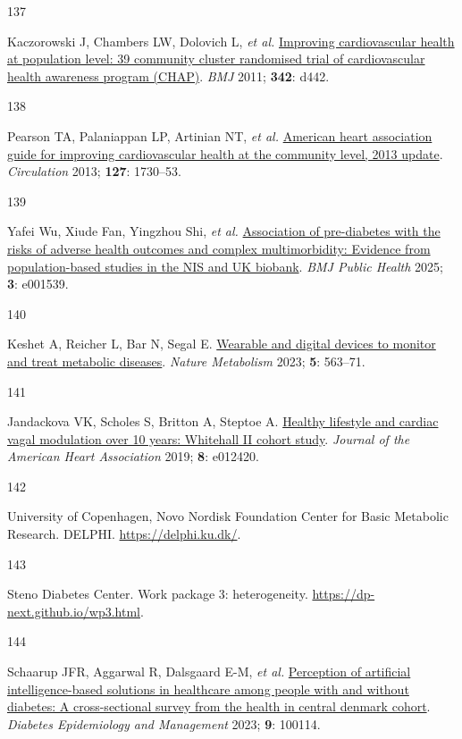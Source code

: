 \documentclass[
  a4paper,
  headsepline=true,
  open=left]{scrbook}
\newlength{\cslhangindent}
\newlength{\csllabelwidth}
\newlength{\cslentryspacingunit} %
\newenvironment{CSLReferences}[2] %
 {%
  \setlength{\parindent}{0pt}
  \ifodd #1
  \let\oldpar\par
  \def\par{\hangindent=\cslhangindent\oldpar}
  \fi
  \setlength{\parskip}{#2\cslentryspacingunit}
 }%
 {}
\newcommand{\CSLLeftMargin}[1]{\parbox[t]{\csllabelwidth}{#1}}
\newcommand{\CSLRightInline}[1]{\parbox[t]{\linewidth - \csllabelwidth}{#1}\break}
\begin{document}
\begin{CSLReferences}{0}{0}
\leavevmode{}%
\CSLLeftMargin{137 }%
\CSLRightInline{Kaczorowski J, Chambers LW, Dolovich L, \emph{et al.}
\href{https://doi.org/10.1136/bmj.d442}{Improving cardiovascular health
at population level: 39 community cluster randomised trial of
cardiovascular health awareness program (CHAP)}. \emph{BMJ} 2011;
\textbf{342}: d442.}

\leavevmode{}%
\CSLLeftMargin{138 }%
\CSLRightInline{Pearson TA, Palaniappan LP, Artinian NT, \emph{et al.}
\href{https://doi.org/10.1161/CIR.0b013e31828f8a94}{American heart
association guide for improving cardiovascular health at the community
level, 2013 update}. \emph{Circulation} 2013; \textbf{127}: 1730--53.}

\leavevmode{}%
\CSLLeftMargin{139 }%
\CSLRightInline{Yafei Wu, Xiude Fan, Yingzhou Shi, \emph{et al.}
\href{https://doi.org/10.1136/bmjph-2024-001539}{Association of
pre-diabetes with the risks of adverse health outcomes and complex
multimorbidity: Evidence from population-based studies in the NIS and UK
biobank}. \emph{BMJ Public Health} 2025; \textbf{3}: e001539.}

\leavevmode{}%
\CSLLeftMargin{140 }%
\CSLRightInline{Keshet A, Reicher L, Bar N, Segal E.
\href{https://doi.org/10.1038/s42255-023-00778-y}{Wearable and digital
devices to monitor and treat metabolic diseases}. \emph{Nature
Metabolism} 2023; \textbf{5}: 563--71.}

\leavevmode{}%
\CSLLeftMargin{141 }%
\CSLRightInline{Jandackova VK, Scholes S, Britton A, Steptoe A.
\href{https://doi.org/10.1161/JAHA.119.012420}{Healthy lifestyle and
cardiac vagal modulation over 10 years: Whitehall II cohort study}.
\emph{Journal of the American Heart Association} 2019; \textbf{8}:
e012420.}

\leavevmode{}%
\CSLLeftMargin{142 }%
\CSLRightInline{University of Copenhagen, Novo Nordisk Foundation Center
for Basic Metabolic Research. DELPHI. \url{https://delphi.ku.dk/}.}

\leavevmode{}%
\CSLLeftMargin{143 }%
\CSLRightInline{Steno Diabetes Center. Work package 3: heterogeneity.
\url{https://dp-next.github.io/wp3.html}.}

\leavevmode{}%
\CSLLeftMargin{144 }%
\CSLRightInline{Schaarup JFR, Aggarwal R, Dalsgaard E-M, \emph{et al.}
\href{https://doi.org/10.1016/j.deman.2022.100114}{Perception of
artificial intelligence-based solutions in healthcare among people with
and without diabetes: A cross-sectional survey from the health in
central denmark cohort}. \emph{Diabetes Epidemiology and Management}
2023; \textbf{9}: 100114.}


\end{CSLReferences}
\end{document}
